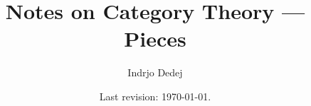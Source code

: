 



\usepackage{xr}


\title{Notes on Category Theory --- Pieces}
\author{Indrjo Dedej}
\date{Last revision: \today{}.}



\maketitle

\tableofcontents




